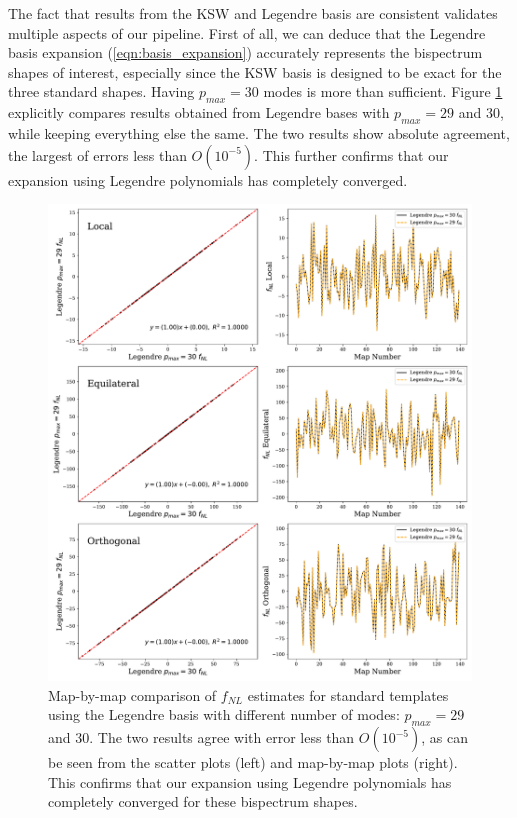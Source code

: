 The fact that results from the KSW and Legendre basis are consistent validates multiple aspects of our pipeline. First of all, we can deduce that the Legendre basis expansion (\ref{eqn:basis_expansion}) accurately represents the bispectrum shapes of interest, especially since the KSW basis is designed to be exact for the three standard shapes. Having $p_{max}=30$ modes is more than sufficient. Figure \ref{fig:map_by_map_Legendre_30_29} explicitly compares results obtained from Legendre bases with $p_{max}=29$ and $30$, while keeping everything else the same. The two results show absolute agreement, the largest of errors less than $O(10^{-5})$. This further confirms that our expansion using Legendre polynomials has completely converged.

\begin{figure}[htbp!] 
	\centering    
	\includegraphics[width=\textwidth]{map_by_map_Legendre_30_29.pdf}
	\caption{Map-by-map comparison of $f_{NL}$ estimates for standard templates using the Legendre basis with different number of modes: $p_{max}=29$ and $30$. The two results agree with error less than $O(10^{-5})$, as can be seen from the scatter plots (left) and map-by-map plots (right). This confirms that our expansion using Legendre polynomials has completely converged for these bispectrum shapes.}
	\label{fig:map_by_map_Legendre_30_29}
\end{figure}

